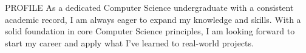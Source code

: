 \documentclass{resume} %
\begin{document}



\begin{rSection}{PROFILE}
    {
        As a dedicated Computer Science undergraduate
        with a consistent
        academic record, I am always eager to expand my knowledge
        and skills. With a solid foundation in core Computer Science
        principles, I am looking forward to start my career and
        apply what I've learned to real-world projects.
    }

\end{rSection}
\end{document}
